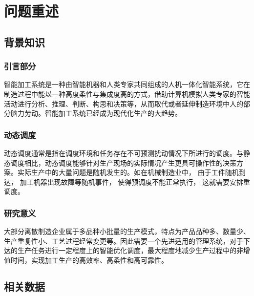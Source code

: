 \documentclass[no-math,withoutpreface,bwprint]{cumcmthesis} %
\numberwithin{equation}{section}
\numberwithin{figure}{section}
\numberwithin{table}{section}
\begin{document}
\vspace{-1.3cm}%

\section{问题重述}

\subsection{背景知识}

\subsubsection{引言部分}

智能加工系统是一种由智能机器和人类专家共同组成的人机一体化智能系统，它在制造过程中能以一种高度柔性与集成度高的方式，借助计算机模拟人类专家的智能活动进行分析、推理、判断、构思和决策等，从而取代或者延伸制造环境中人的部分脑力劳动。智能加工系统已经成为现代化生产的大趋势。

\subsubsection{动态调度}

动态调度通常是指在调度环境和任务存在不可预测扰动情况下所进行的调度。与静态调度相比，动态调度能够针对生产现场的实际情况产生更具可操作性的决策方案。实际生产中的大量问题是随机发生的。如在机械制造业中， 由于工件随机到达， 加工机器出现故障等随机事件， 使得预调度不能正常执行， 这就需要安排重调度。

\subsubsection{研究意义}

大部分离散制造企业属于多品种小批量的生产模式，特点为产品品种多、数量少、生产重复性小、工艺过程经常变更等。因此需要一个先进适用的管理系统，对于下达的生产任务进行一定程度上的智能优化调度，最大程度地减少生产过程中的非增值时间，实现加工生产的高效率、高柔性和高可靠性。

\subsection{相关数据}
\end{document}
